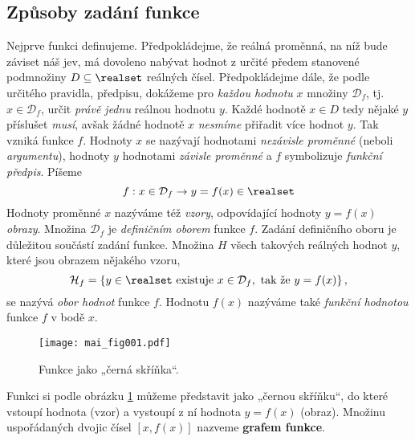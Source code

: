     \subsection{Způsoby zadání funkce}\label{mai:IchapIIIsecIssecI}
      Nejprve funkci definujeme. Předpokládejme, že reálná proměnná, na níž bude záviset náš jev, 
      má dovoleno nabývat hodnot z určité předem stanovené podmnožiny \(D\subseteq\realset\) 
      reálných čísel. Předpokládejme dále, že podle určitého pravidla, předpisu, dokážeme pro 
      \emph{každou hodnotu} \(x\) množiny \(\mathcal{D}_f\), tj. \(x \in \mathcal{D}_f\), určit 
      \emph{právě jednu} reálnou hodnotu \(y\). Každé hodnotě \(x \in D\) tedy nějaké \(y\) 
      příslušet \emph{musí},  avšak žádné hodnotě \(x\) \emph{nesmíme} přiřadit více hodnot 
      \(y\). Tak vzniká funkce \(f\). Hodnoty \(x\) se nazývají hodnotami \emph{nezávisle 
      proměnné} (neboli \emph{argumentu}), hodnoty \(y\) hodnotami \emph{závisle proměnné} a 
      \(f\) symbolizuje \emph{funkční předpis}. Píšeme
      \begin{equation}\label{mai:eq000}
          f: x \in \mathcal{D}_f \rightarrow y=f(x)\in\realset
      \end{equation}
      Hodnoty proměnné \(x\) nazýváme též \emph{vzory}, odpovídající hodnoty \(y = f(x)\) 
      \emph{obrazy}. Množina  \(\mathcal{D}_f\) je \emph{definičním oborem} funkce \(f\). Zadání 
      definičního oboru je důležitou součástí zadání funkce. Množina \(H\) všech takových reálných 
      hodnot \(y\), které jsou obrazem nějakého vzoru, 
      \begin{equation}\label{mai:eq001}
          \mathcal{H}_f = 
              \left\lbrace 
                y\in\realset\text{ existuje } x\in \mathcal{D}_f, \text{ tak že } y = f(x)  
              \right\rbrace, 
      \end{equation}
      se nazývá \emph{obor hodnot} funkce \(f\). Hodnotu \(f(x)\) nazýváme také \emph{funkční 
      hodnotou} funkce \(f\) v bodě \(x\). 

      \begin{figure}[ht!] %
        \centering
%        
        \texttt{[image: mai\_fig001.pdf]}
        \caption{Funkce jako „černá skříňka“. \cite[s.~54]{Musilova2009MA1}}
        \label{mai:fig001}
      \end{figure}
      
      Funkci si podle obrázku \ref{mai:fig001} můžeme představit jako „černou skříňku“, do které 
      vstoupí hodnota (vzor) a vystoupí z ní hodnota \(y = f(x)\) (obraz). Množinu uspořádaných 
      dvojic čísel \([x, f(x)]\) nazveme \textbf{grafem funkce}.
      
